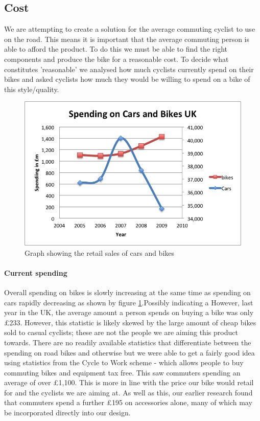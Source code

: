 \documentclass[]{report}
\begin{document}
\subsection{Cost}
We are attempting to create a solution for the average commuting cyclist to use on the road. This means it is important that the average commuting person is able to afford the product. To do this we must be able to find the right components and produce the bike for a reasonable cost. To decide what constitutes 'reasonable' we analysed how much cyclists currently spend on their bikes and asked cyclists how much they would be willing to spend on a bike of this style/quality.
\begin{figure}
\centering
\includegraphics[scale=0.9]{figures/cars-bikes-spending}
\caption{Graph showing the retail sales of cars and bikes \cite{uk-stats}}
\label{fig:cars_bikes_spending}
\end{figure}
\paragraph{Current spending}
Overall spending on bikes is slowly increasing at the same time as spending on cars rapidly decreasing as shown by figure \ref{fig:cars_bikes_spending}.Possibly indicating a   However, last year in the UK, the average amount a person spends on buying a bike was only £233. However, this statistic is likely skewed by the large amount of cheap bikes sold to casual cyclists; these are not the people we are aiming this product towards\cite{spending-more}. There are no readily available statistics that differentiate between the spending on road bikes and otherwise but we were able to get a fairly good idea using statistics from the Cycle to Work scheme - which allows people to buy commuting bikes and equipment tax free. This saw commuters spending an average of over £1,100\cite{spending-more}. This is more in line with the price our bike would retail for and the cyclists we are aiming at. As well as this, our earlier research found that commuters spend a further £195 on accessories alone, many of which may be incorporated directly into our design.
\end{document}
